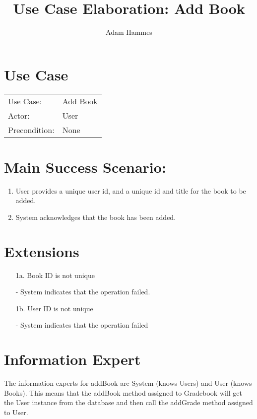 \documentclass{article}
\title{Use Case Elaboration: Add Book}
\author{Adam Hammes}
\begin{document}
\maketitle

\section*{Use Case}
\begin{tabular}{l l}
  Use Case:     & Add Book    \\
  Actor:        & User        \\
  Precondition: & None \\
\end{tabular}

\section*{Main Success Scenario:}
\begin{enumerate}
  \item User provides a unique user id, and a unique id and title for the book to be added.
  \item System acknowledges that the book has been added.
\end{enumerate}

\section*{Extensions}
\begin{itemize}
  \item [1a.] Book ID is not unique

    - System indicates that the operation failed.
    
  \item [1b.] User ID is not unique
  
    - System indicates that the operation failed
\end{itemize}

\section*{Information Expert}

The information experts for addBook are System (knows Users) and User (knows
Books).
This means that the addBook method assigned to Gradebook will get the User
instance from the database and then call the addGrade method assigned to User.
\end{document}
